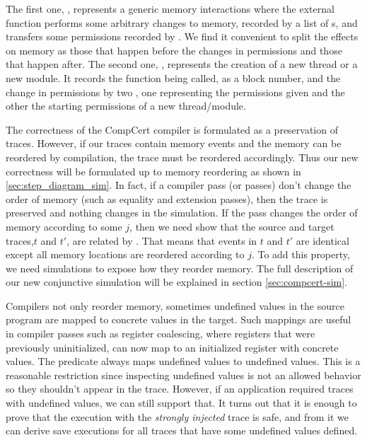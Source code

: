 The first one, , represents a generic memory interactions where the external function performs some arbitrary changes to memory, recorded by a list of s, and transfers some permissions recorded by . We find it convenient to split the effects on memory as those that happen before the changes in permissions and those that happen after. 
The second one,  , represents the creation of a new thread or a new module. It records the function being called, as a block number, and the change in permissions by two , one representing the permissions given and the other the starting permissions of a new thread/module.

The correctness of the CompCert compiler is formulated as a preservation of traces. However, if our traces contain memory events and the memory can be reordered by compilation, the trace must be reordered accordingly. Thus our new correctness will be formulated up to memory reordering as shown in \ref{sec:step_diagram_sim}. In fact, if a compiler pass (or passes) don't change the order of memory (such as equality and extension passes), then the trace is preserved and nothing changes in the simulation. If the pass changes the order of memory according to some $j$, then we need show that the source and target traces,$t$ and $t'$, are related by . That means that events in $t$ and $t'$ are identical except all memory locations are reordered according to $j$. To add this property, we need simulations to expose how they reorder memory. The full description of our new conjunctive simulation will be explained in section \ref{sec:compcert-sim}.


Compilers not only reorder memory, sometimes undefined values in the source program are mapped to concrete values in the target. Such mappings are useful in compiler passes such as register coalescing, where registers that were previously uninitialized, can now map to an initialized register with concrete values. The predicate  always maps undefined values to undefined values. This is a reasonable restriction since inspecting undefined values is not an allowed behavior so they shouldn't appear in the trace. However, if an application required traces with undefined values, we can still support that. It turns out that it is enough to prove that the execution with the \emph{strongly injected} trace is safe, and from it we can derive save executions for all traces that have some undefined values defined.
